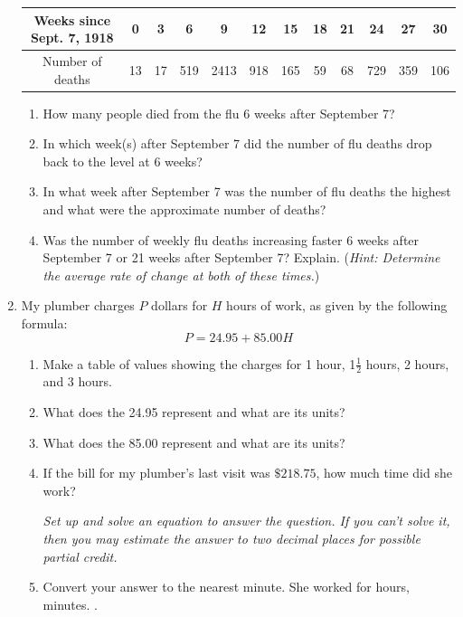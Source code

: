\documentclass[12pt]{article}
\begin{document}
\begin{enumerate}
\begin{tabular} {|c|c|c|c|c |c|c|c|c|c |c|c|} \hline
Weeks since Sept. 7, 1918 & 0 & 3 & 6  & 9  & 12  & 15  & 18 & 21  & 24  & 27  & 30 \\ \hline
Number of deaths &13 & 17 & 519 & 2413 & 918 & 165 & 59 & 68 & 729 & 359 & 106 \\ \hline
\end{tabular}

\begin{enumerate}
\item How many people died from the flu 6 weeks after September 7?
\vfill
\item In which week(s) after September 7 did the number of flu deaths drop back to the level at 6 weeks?
\vfill
\item In what week after September 7 was the number of flu deaths the highest and what were the approximate number of deaths?
\vfill
\item Was the number of weekly flu deaths increasing faster 6 weeks after September 7 or 21 weeks after September 7?  Explain. (\emph{Hint: Determine the average rate of change at both of these times.})
\vfill
\end{enumerate}

\newpage %

\item My plumber charges $P$ dollars for $H$ hours of work, as given by the following formula:
$$P = 24.95 + 85.00H$$

\begin{enumerate}
\item Make a table of values showing the charges for 1 hour, 1$\frac{1}{2}$ hours, 2 hours, and 3 hours.
\vfill
\item What does the 24.95 represent and what are its units?
\vfill
\item What does the 85.00 represent and what are its units?
\vfill
\item If the bill for my plumber's last visit was $\$218.75$, how much time did she work?

\emph{Set up and solve an equation to answer the question.  If you can't solve it, then you may estimate the answer to two decimal places for possible partial credit.}
\vfill
\vfill
\vfill
\item Convert your answer to the nearest minute.
\vfill
She worked for \hrulefill hours, \hrulefill minutes. \hspace{3in}.
\end{enumerate}


\end{enumerate}
\end{document}
